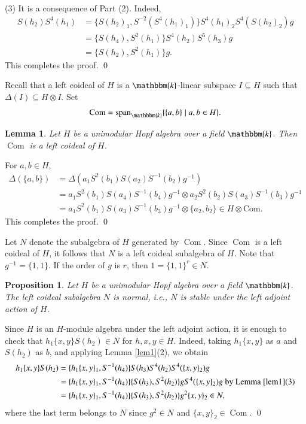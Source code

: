 \documentclass[11pt]{amsart}
\newtheorem{lem}[thm]{Lemma}
\newtheorem{prop}[thm]{Proposition}
\numberwithin{equation}{section}
\begin{document}
(3) It is a consequence of Part (2). Indeed, 
\begin{align*}
S(h_2)S^4(h_1)&=\{S(h_2)_1,S^{-2}(S^4(h_1)_1)\}S^4(h_1)_2S^4(S(h_2)_2)g\\
&=\{S(h_4),S^{2}(h_1)\}S^4(h_2)S^5(h_3)g\\
&=\{S(h_2),S^{2}(h_1)\}g.
\end{align*}
This completes the proof.
\qed

Recall that a left coideal of $H$ is a $\mathbbm{k}$-linear subspace $I\subseteq H$ such that $\Delta(I)\subseteq H\otimes I$.
Set $$\text{Com}=\text{span}_{\mathbbm{k}}\{\{a,b\}\mid a,b\in H\}.$$ 
\begin{lem}
Let $H$ be a unimodular Hopf algebra over a field $\mathbbm{k}$. Then $\operatorname{Com}$ is a left coideal of $H$. 
\end{lem}
\proof For $a,b\in H$, 
\begin{align*}
\Delta(\{a,b\})&=\Delta(a_{1}S^2(b_{1})S(a_{2})S^{-1}(b_{2})g^{-1})\\
&=a_{1}S^2(b_{1})S(a_{4})S^{-1}(b_{4})g^{-1}\otimes a_{2}S^2(b_{2})S(a_{3})S^{-1}(b_{3})g^{-1}\\
&=a_{1}S^2(b_{1})S(a_{3})S^{-1}(b_{3})g^{-1}\otimes \{a_2,b_2\}\in H\otimes \text{Com}.
\end{align*}
This completes the proof.
\qed

Let $N$ denote the subalgebra of $H$ generated by $\operatorname{Com}$. Since $\operatorname{Com}$ is a left coideal of $H$, it follows that $N$ is a left coideal subalgebra of $H$.
Note that $g^{-1}=\{1,1\}$. If the order of $g$ is $r$, then $1=\{1,1\}^r\in N$.

\begin{prop}Let $H$ be a unimodular Hopf algebra over a field $\mathbbm{k}$.
The left coideal subalgebra $N$ is normal, i.e., $N$ is stable under the left adjoint action of $H$.
\end{prop}
\proof
Since $H$ is an $H$-module algebra under the left adjoint action, it is enough to check that $h_1\{x,y\}S(h_2)\in N$ for $h,x,y\in H$. Indeed, taking $h_1\{x,y\}$ as $a$ and $S(h_2)$ as $b$, and applying Lemma \ref{lem1}(2), we obtain
\begin{align*}
h_1\{x,y\}S(h_2)&=\{h_1\{x,y\}_1,S^{-1}(h_4)\}S(h_3)S^4(h_2)S^4(\{x,y\}_2)g\\
&=\{h_1\{x,y\}_1,S^{-1}(h_4)\}\{S(h_3),S^2(h_2)\}gS^4(\{x,y\}_2)g\ \text{by\ Lemma}\ \ref{lem1} (3)\\
&=\{h_1\{x,y\}_1,S^{-1}(h_4)\}\{S(h_3),S^2(h_2)\}g^2\{x,y\}_2\in N,
\end{align*}
where the last term belongs to $N$ since $g^2\in N$ and $\{x,y\}_2\in \operatorname{Com}$.
\qed
\end{document}
